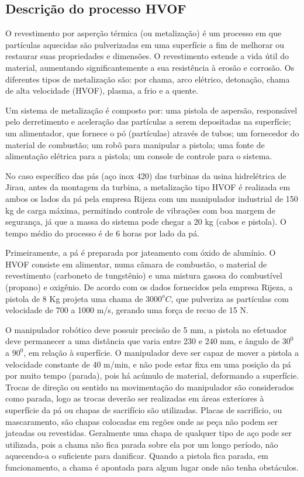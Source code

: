 \subsection{Descrição do processo HVOF}\label{sec::desc_hvof}
O revestimento por asperção térmica (ou metalização) é um processo em que
partículas aquecidas são pulverizadas em uma superfície a fim de melhorar ou
restaurar suas propriedades e dimensões. O revestimento estende a vida útil do
material, aumentando significantemente a sua resistência à erosão e corrosão.
Os diferentes tipos de metalização são: por chama, arco elétrico, detonação,
chama de alta velocidade (HVOF), plasma, a frio e a quente.

Um sistema de metalização é composto por: uma pistola de aspersão, responsável
pelo derretimento e aceleração das partículas a serem depositadas na
superfície; um alimentador, que fornece o pó (partículas) através de tubos;
um fornecedor do material de combustão; um robô para manipular a pistola; uma
fonte de alimentação elétrica para a pistola; um console de controle para o
sistema.

No caso específico das pás (aço inox 420) das turbinas da usina hidrelétrica de
Jirau, antes da montagem da turbina, a metalização tipo HVOF é realizada em
ambos os lados da pá pela empresa Rijeza com um manipulador industrial de 150 kg
de carga máxima, permitindo controle de vibrações com boa margem de segurança, já que a massa do
sistema pode chegar a 20 kg (cabos e pistola). O tempo
médio do processo é de 6 horas por lado da pá.

Primeiramente, a pá é preparada por jateamento com óxido de alumínio. O HVOF
consiste em alimentar, numa câmara de combustão, o material de revestimento
(carboneto de tungstênio) e uma mistura gasosa do combustível (propano) e
oxigênio. De acordo com os dados fornecidos pela empresa Rijeza, a pistola de 8
Kg projeta uma chama de $3000^oC$, que pulveriza as partículas com velocidade de
700 a 1000 m/s, gerando uma força de recuo de 15 N.

O manipulador robótico deve possuir precisão de 5 mm, a pistola no efetuador
deve permanecer a uma distância que varia entre 230 e 240 mm, e ângulo de $30^0$
a $90^0$, em relação à superfície. O manipulador deve ser capaz de mover a
pistola a velocidade constante de 40 m/min, e não pode estar fixa em uma posição
da pá por muito tempo (parada), pois há acúmulo de material, deformando a
superfície. Trocas de direção ou sentido na movimentação do manipulador são
considerados como parada, logo as trocas deverão ser realizadas em áreas
exteriores à superfície da pá ou chapas de sacrifício são utilizadas. Placas de
sacrifício, ou mascaramento, são chapas colocadas em regões onde as peça não
podem ser jateadas ou revestidas. Geralmente uma chapa de qualquer tipo de aço
pode ser utilizada, pois a chama não fica parada sobre ela por um longo período,
não aquecendo-a o suficiente para danificar. Quando a pistola fica parada, em
funcionamento, a chama é apontada para algum lugar onde não tenha obstáculos.

